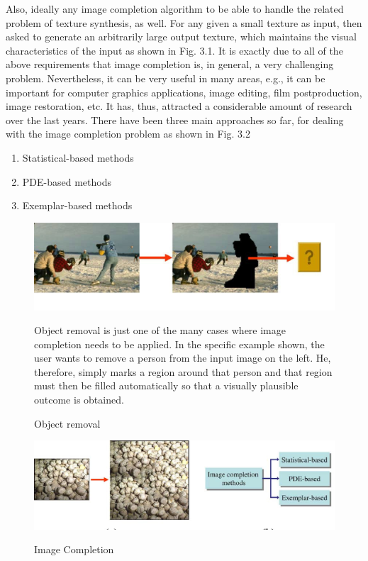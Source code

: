 Also, ideally any image completion algorithm to be able to handle the related problem of texture synthesis, as
well. For any  given a small texture as input,  then asked to generate an arbitrarily large output texture, which maintains the visual characteristics of the input as shown in Fig. 3.1. It is exactly due to all of the above requirements that image completion is, in general, a very challenging problem.
Nevertheless, it can be very useful in many areas, e.g., it can be important for computer graphics applications, image editing,
film postproduction, image restoration, etc. It has, thus, attracted a considerable amount of research over
the last years.  There have been three main approaches so far, for dealing with the image completion problem
as shown in Fig. 3.2
\begin{enumerate}
  \item Statistical-based methods
  \item PDE-based methods
  \item Exemplar-based methods
\end{enumerate}
\begin{figure}
  \includegraphics[width=6in]{prune1.eps}\\
  \caption{Object removal}\label{}
Object removal is just one of the many cases where image completion
needs to be applied. In the specific example shown, the user wants to remove a
person from the input image on the left. He, therefore, simply marks a region
around that person and that region must then be filled automatically so that a
visually plausible outcome is obtained.
\end{figure}


\begin{figure}
  \includegraphics[width=6in]{prune2.eps}\\
  \caption{Image Completion}\label{}
\end{figure}




